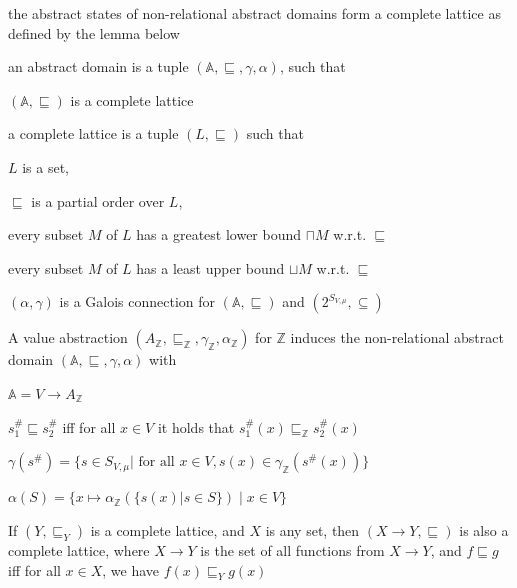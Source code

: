 \documentclass[a4paper]{article}
\begin{document}
\begin{minipage}[t]{0.16\linewidth}
\begin{betterlist}
{{\begin{betterlist}
\begin{betterlist}
						\item the abstract states of non-relational abstract domains form a complete lattice as defined by the lemma below
						\item an \alert{abstract domain} is a tuple $(\mathbb{A}, \sqsubseteq, \gamma, \alpha)$, such that
						\begin{betterlist}
							\item $(\mathbb{A}, \sqsubseteq)$ is a complete lattice
							\begin{betterlist}
								\item a \alert{complete lattice} is a tuple $(L, \sqsubseteq)$ such that
								\begin{betterlist}
									\item $L$ is a set,
									\item $\sqsubseteq $ is a \alert{partial order} over $L$,
									\item every subset $M$ of $L$ has a \alert{greatest lower bound} $\sqcap M$ w.r.t. $\sqsubseteq$
									\item every subset $M$ of $L$ has a \alert{least upper bound} $\sqcup M$ w.r.t. $\sqsubseteq$
								\end{betterlist}
							\end{betterlist}
							\item $(\alpha, \gamma)$ is a Galois connection for $(\mathbb{A}, \sqsubseteq)$ and $(2^{S_{V ,\mu}}, \subseteq)$
						\end{betterlist}
						\item A value abstraction $(A_{\mathbb{Z}}, \sqsubseteq_{\mathbb{Z}}, \gamma_{\mathbb{Z}}, \alpha_{\mathbb{Z}})$ for $\mathbb{Z}$ induces the \alert{non-relational abstract domain} $(\mathbb{A}, \sqsubseteq, \gamma, \alpha)$ with
						\begin{betterlist}
							\item $\mathbb{A} = V \rightarrow A_{\mathbb{Z}}$
							\item $s^\#_1 \sqsubseteq s^\#_2$ iff for all $x \in V$ it holds that $s^\#_1(x) \sqsubseteq_{\mathbb{Z}} s^\#_2(x)$
							\item $\gamma(s^\#) = \{s \in S_{V ,\mu} | \text{ for all } x \in V, s(x) \in \gamma_{\mathbb{Z}}(s^\#(x))\}$
							\item $\alpha(S) = \{x \mapsto \alpha_{\mathbb{Z}}(\{s(x) | s \in S\}) \mid x \in V\}$
						\end{betterlist}
						\item If $(Y, \sqsubseteq_Y)$ is a complete lattice, and $X$ is any set, then $(X\rightarrow Y, \sqsubseteq)$ is also a complete lattice, where $X \rightarrow Y$ is the set of all functions from $X \rightarrow Y$, and $f \sqsubseteq g$ iff for all $x \in X$, we have $f(x) \sqsubseteq_Y g(x)$

\end{betterlist}
\end{betterlist}}}
\end{betterlist}
\end{minipage}
\end{document}
